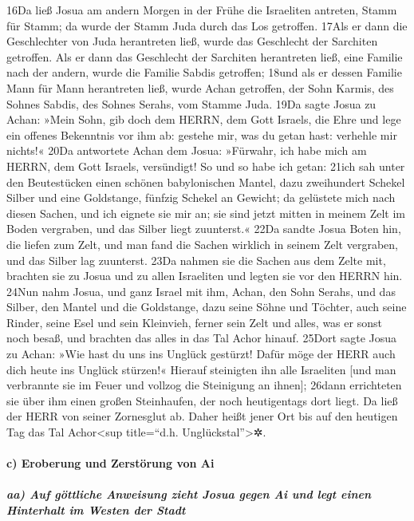 16Da ließ Josua am andern Morgen in der Frühe die Israeliten antreten,
Stamm für Stamm; da wurde der Stamm Juda durch das Los getroffen. 17Als
er dann die Geschlechter von Juda herantreten ließ, wurde das Geschlecht
der Sarchiten getroffen. Als er dann das Geschlecht der Sarchiten
herantreten ließ, eine Familie nach der andern, wurde die Familie Sabdis
getroffen; 18und als er dessen Familie Mann für Mann herantreten ließ,
wurde Achan getroffen, der Sohn Karmis, des Sohnes Sabdis, des Sohnes
Serahs, vom Stamme Juda. 19Da sagte Josua zu Achan: »Mein Sohn, gib doch
dem HERRN, dem Gott Israels, die Ehre und lege ein offenes Bekenntnis
vor ihm ab: gestehe mir, was du getan hast: verhehle mir nichts!« 20Da
antwortete Achan dem Josua: »Fürwahr, ich habe mich am HERRN, dem Gott
Israels, versündigt! So und so habe ich getan: 21ich sah unter den
Beutestücken einen schönen babylonischen Mantel, dazu zweihundert
Schekel Silber und eine Goldstange, fünfzig Schekel an Gewicht; da
gelüstete mich nach diesen Sachen, und ich eignete sie mir an; sie sind
jetzt mitten in meinem Zelt im Boden vergraben, und das Silber liegt
zuunterst.« 22Da sandte Josua Boten hin, die liefen zum Zelt, und man
fand die Sachen wirklich in seinem Zelt vergraben, und das Silber lag
zuunterst. 23Da nahmen sie die Sachen aus dem Zelte mit, brachten sie zu
Josua und zu allen Israeliten und legten sie vor den HERRN hin. 24Nun
nahm Josua, und ganz Israel mit ihm, Achan, den Sohn Serahs, und das
Silber, den Mantel und die Goldstange, dazu seine Söhne und Töchter,
auch seine Rinder, seine Esel und sein Kleinvieh, ferner sein Zelt und
alles, was er sonst noch besaß, und brachten das alles in das Tal Achor
hinauf. 25Dort sagte Josua zu Achan: »Wie hast du uns ins Unglück
gestürzt! Dafür möge der HERR auch dich heute ins Unglück stürzen!«
Hierauf steinigten ihn alle Israeliten {[}und man verbrannte sie im
Feuer und vollzog die Steinigung an ihnen{]}; 26dann errichteten sie
über ihm einen großen Steinhaufen, der noch heutigentags dort liegt. Da
ließ der HERR von seiner Zornesglut ab. Daher heißt jener Ort bis auf
den heutigen Tag das Tal Achor\textless sup title=``d.h.
Unglückstal''\textgreater✲.

\hypertarget{c-eroberung-und-zerstuxf6rung-von-ai}{%
\paragraph{c) Eroberung und Zerstörung von
Ai}\label{c-eroberung-und-zerstuxf6rung-von-ai}}

\hypertarget{aa-auf-guxf6ttliche-anweisung-zieht-josua-gegen-ai-und-legt-einen-hinterhalt-im-westen-der-stadt}{%
\subparagraph{aa) Auf göttliche Anweisung zieht Josua gegen Ai und legt
einen Hinterhalt im Westen der
Stadt}\label{aa-auf-guxf6ttliche-anweisung-zieht-josua-gegen-ai-und-legt-einen-hinterhalt-im-westen-der-stadt}}

